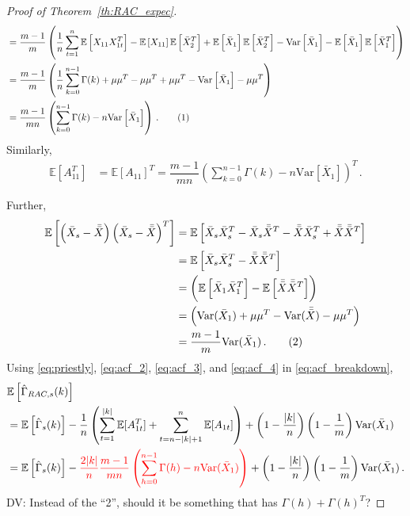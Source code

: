 \documentclass[11pt]{article}
\newcommand{\E}{\mathbb{E}}
\newcommand{\Var}{\text{Var}}
\newcommand\numberthis{\addtocounter{equation}{1}\tag{\theequation}}
\theoremstyle{remark}
\begin{document}
\begin{proof}[Proof of Theorem~\ref{th:RAC_expec}]
\begin{align*}
    &= \dfrac{m-1}{m}\left(\dfrac{1}{n}\sum_{t=1}^{n}\mathbb{E} \left[X_{11}X_{1t}^T \right] - \mathbb{E}\left[X_{11}\right] \mathbb{E}\left[\bar{X}_2^T \right] + \mathbb{E} \left[\bar{X}_1\right]\mathbb{E}\left[\bar{X}_2^T\right] - \text{Var}\left[\bar{X}_1 \right] - \mathbb{E}\left[\bar{X}_1 \right]\mathbb{E}\left[\bar{X}_1^T \right]\right)\\
    &= \dfrac{m-1}{m}\left(\dfrac{1}{n}\sum_{k=0}^{n-1}\Gamma(k) + \mu \mu^T - \mu \mu^T + \mu \mu^T - \text{Var}\left[\bar{X}_1 \right] - \mu \mu^T\right)\\
    &= \dfrac{m-1}{mn}\left(\sum_{k=0}^{n-1}\Gamma(k) - n\text{Var}\left[\bar{X}_1 \right]\right)\,. \numberthis \label{eq:acf_2}
\end{align*}
%
Similarly,
%    
\begin{align}
\label{eq:acf_3}
    \mathbb{E} \left[ A_{11}^T \right] &= \mathbb{E}\left[ A_{11}\right]^T = \dfrac{m-1}{mn}\left(\sum_{k=0}^{n-1}\Gamma(k) - n\text{Var}\left[\bar{X}_1 \right] \right)^T\,.
\end{align}


Further,
\begin{align*}
\mathbb{E}\left[ \left(\bar{X}_{s} - \bar{\bar{X}} \right)  \left(\bar{X}_{s} - \bar{\bar{X}} \right)^{T}\right] &= \mathbb{E}\left[ \bar{X}_{s}\bar{X}_{s}^{T} - \bar{X}_{s}\bar{\bar{X}}^{T} - \bar{\bar{X}} \bar{X}_{s}^{T} + \bar{\bar{X}}\bar{\bar{X}}^{T}\right]\\
&= \mathbb{E}\left[ \bar{X}_{s}\bar{X}_{s}^{T} - \bar{\bar{X}}\bar{\bar{X}}^{T}\right]\\
&= \left(\mathbb{E}\left[\bar{X}_{1}\bar{X}_{1}^{T}\right] - \mathbb{E}\left[\bar{\bar{X}}\bar{\bar{X}}^{T}\right]\right)\\
&= \left(\Var(\bar{X}_{1}) + \mu\mu^{T} - \Var(\bar{\bar{X}}) - \mu\mu^{T}\right)\\
&= \dfrac{m-1}{m}\Var(\bar{X}_1)\,. \numberthis \label{eq:acf_4}
\end{align*}
%
Using \eqref{eq:priestly}, \eqref{eq:acf_2}, \eqref{eq:acf_3}, and \eqref{eq:acf_4} in \eqref{eq:acf_breakdown},
\begin{align*}
& \E \left[\hat{\Gamma}_{RAC,s}(k) \right] \\
&= \mathbb{E}\left[\hat{\Gamma}_{s}(k)\right] - \dfrac{1}{n} \left(\sum\limits_{t=1}^{|k|}\mathbb{E}[A_{1t}^T] + \sum\limits_{t=n-|k|+1}^{n}\mathbb{E}[A_{1t}]\right) + \left(1- \dfrac{|k|}{n}\right)\left(1-\dfrac{1}{m}\right)\Var(\bar{X}_1)\\
    &= \mathbb{E}\left[\hat{\Gamma}_{s}(k)\right] - {\color{red}\dfrac{2|k|}{n}\dfrac{m-1}{mn}\left(\sum_{h=0}^{n-1}\Gamma(h) - n \Var(\bar{X}_1)\right)} + \left(1- \dfrac{|k|}{n}\right)\left(1-\dfrac{1}{m}\right)\Var(\bar{X}_1)\,.
\end{align*}
{\color{red} DV: Instead of the ``2'', should it be something that has $\Gamma(h) + \Gamma(h)^T$?}


\end{proof}
\end{document}

